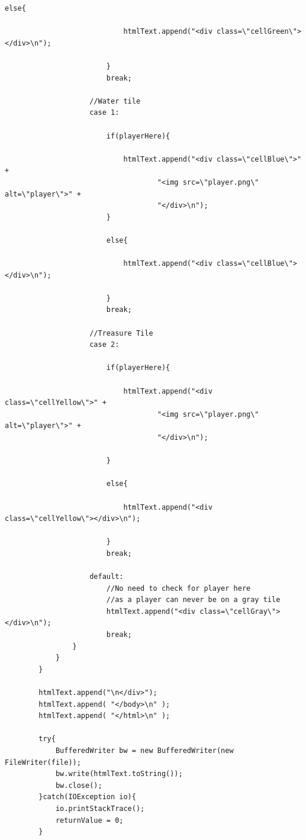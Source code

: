 \documentclass[a4paper,12pt]{extarticle}
\begin{document}
\begin{lstlisting}[caption=The initial code of the Game class, label=amb]
                        else{

                            htmlText.append("<div class=\"cellGreen\"></div>\n");

                        }
                        break;

                    //Water tile
                    case 1:

                        if(playerHere){

                            htmlText.append("<div class=\"cellBlue\">" +
                                    "<img src=\"player.png\" alt=\"player\">" +
                                    "</div>\n");
                        }

                        else{

                            htmlText.append("<div class=\"cellBlue\"></div>\n");

                        }
                        break;

                    //Treasure Tile
                    case 2:

                        if(playerHere){

                            htmlText.append("<div class=\"cellYellow\">" +
                                    "<img src=\"player.png\" alt=\"player\">" +
                                    "</div>\n");

                        }

                        else{

                            htmlText.append("<div class=\"cellYellow\"></div>\n");

                        }
                        break;

                    default:
                        //No need to check for player here
                        //as a player can never be on a gray tile
                        htmlText.append("<div class=\"cellGray\"></div>\n");
                        break;
                }
            }
        }

        htmlText.append("\n</div>");
        htmlText.append( "</body>\n" );
        htmlText.append( "</html>\n" );

        try{
            BufferedWriter bw = new BufferedWriter(new FileWriter(file));
            bw.write(htmlText.toString());
            bw.close();
        }catch(IOException io){
            io.printStackTrace();
            returnValue = 0;
        }


\end{lstlisting}
\end{document}
